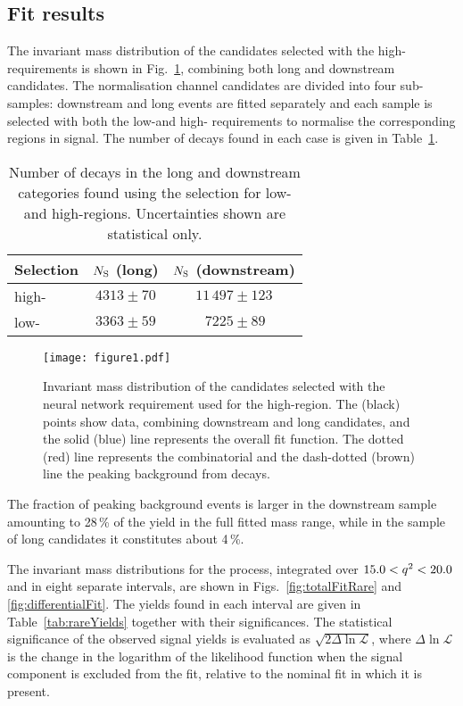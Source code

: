 \subsection{Fit results}
 The invariant mass distribution of the \decay{\Lb}{\jpsi\Lz}
 candidates selected with the high-\qsq requirements is shown in
 Fig.~\ref{fig:totalFit}, combining both long and downstream
 candidates.  The normalisation channel candidates are divided into
 four sub-samples: downstream and long events are fitted separately
 and each sample is selected with both the low-\qsq and high-\qsq
 requirements to normalise the corresponding \qsq regions in signal.
 The number of \decay{\Lb}{\jpsi\Lz} decays found in each case
 is given in Table~\ref{tab:jpsi_yield}.
%
\begin{table}[tbp]
\centering
\caption{Number of \decay{\Lb}{\jpsi\Lz} decays in the long and
  downstream categories found using the selection for low- and
  high-\qsq regions. Uncertainties shown are statistical only.}
\begin{tabular}{lcc}
Selection & $N_{\rm S}$ (long) & $N_{\rm S}$ (downstream)\\ \hline
high-\qsq	& $4313 \pm 70$	 	&  $11\,497 \pm 123$ \\
low-\qsq	& $3363 \pm 59$ 	&  $\phantom{0}\,7225 \pm 89\phantom{0}$  \\
 \hline
\end{tabular}
\label{tab:jpsi_yield}
\end{table}
%
\begin{figure}[tpbh!]
\centering \texttt{[image: figure1.pdf]}
\caption{\small Invariant mass distribution of the \decay{\Lb}{\jpsi\Lz}
  candidates selected with the neural network requirement used for the high-\qsq region.
  The (black) points show data, combining downstream
  and long candidates, and the solid (blue) line represents the
  overall fit function.  The dotted (red) line represents the combinatorial
  and the dash-dotted (brown) line the peaking background from
  \decay{\Bz}{\jpsi\KS} decays.}
\label{fig:totalFit}
\end{figure}

  The fraction of peaking background events is larger in the
  downstream sample amounting to 28\,\% of the \decay{\Lb}{\jpsi\Lz} yield in the
  full fitted mass range, while in the sample of long candidates it
  constitutes about 4\,\%.

  The invariant mass distributions for the \decay{\Lb}{\Lz\mumu}
  process, integrated over $15.0<{q^2}<20.0$\gevgevcccc and in eight
  separate \qsq intervals, are shown in Figs.~\ref{fig:totalFitRare}
  and \ref{fig:differentialFit}.  The yields found in each \qsq
  interval are given in Table~\ref{tab:rareYields} together with their
  significances.  The statistical significance of the observed signal
  yields is evaluated as $\sqrt{2\Delta\ln{\mathcal{L}}}$, where
  $\Delta\ln{\mathcal{L}}$ is the change in the logarithm of the
  likelihood function when the signal component is excluded from the
  fit, relative to the nominal fit in which it is present.

